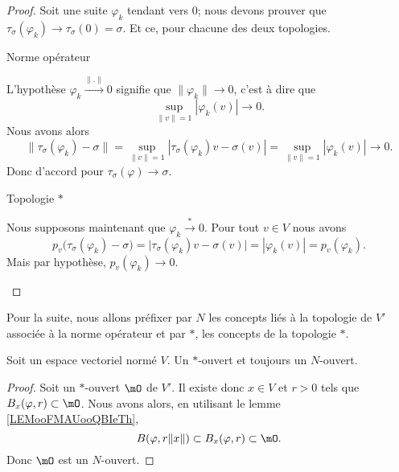 \begin{proof}
    Soit une suite \( \varphi_k\) tendant vers \( 0\); nous devons prouver que \( \tau_{\sigma}(\varphi_k)\to \tau_{\sigma}(0)=\sigma\). Et ce, pour chacune des deux topologies.

    \begin{subproof}
        \item[Norme opérateur]
        
            L'hypothèse \( \varphi_k\stackrel{\| . \|}{\longrightarrow} 0\) signifie que \( \| \varphi_k \|\to 0\), c'est à dire que
            \begin{equation}
                \sup_{\| v \|=1}| \varphi_k(v) |\to 0.
            \end{equation}
            Nous avons alors
            \begin{equation}
                \| \tau_{\sigma}(\varphi_k)-\sigma \|=\sup_{\| v \|=1}| \tau_{\sigma}(\varphi_k)v-\sigma(v) |=\sup_{\| v \|=1}| \varphi_k(v) |\to 0.
            \end{equation}
            Donc d'accord pour \( \tau_{\sigma}(\varphi)\to \sigma\).

        \item[Topologie $*$]

            Nous supposons maintenant que \( \varphi_k\stackrel{*}{\longrightarrow}0\). Pour tout \( v\in V\) nous avons
            \begin{equation}
                p_v\big( \tau_{\sigma}(\varphi_k)-\sigma \big)=\big| \tau_{\sigma}(\varphi_k)v-\sigma(v) \big|=| \varphi_k(v) |=p_v(\varphi_k).
            \end{equation}
            Mais par hypothèse, \( p_v(\varphi_k)\to 0\).
    \end{subproof}
\end{proof}

Pour la suite, nous allons préfixer par \( N\) les concepts liés à la topologie de \( V'\) associée à la norme opérateur et par \( *\), les concepts de la topologie \( *\).

\begin{proposition}     \label{PROPooFGXAooFRWweD}
    Soit un espace vectoriel normé \( V\). Un \( *\)-ouvert et toujours un \( N\)-ouvert.
\end{proposition}

\begin{proof}
    Soit un \( *\)-ouvert \( \mO\) de \( V'\). Il existe donc \( x\in V\) et \( r>0\) tels que \( B_x(\varphi,r)\subset \mO\). Nous avons alors, en utilisant le lemme \ref{LEMooFMAUooQBIeTh},
    \begin{equation}
        B(\varphi,r\| x \|)\subset B_x(\varphi,r)\subset \mO.
    \end{equation}
    Donc \( \mO\) est un \( N\)-ouvert.
\end{proof}

